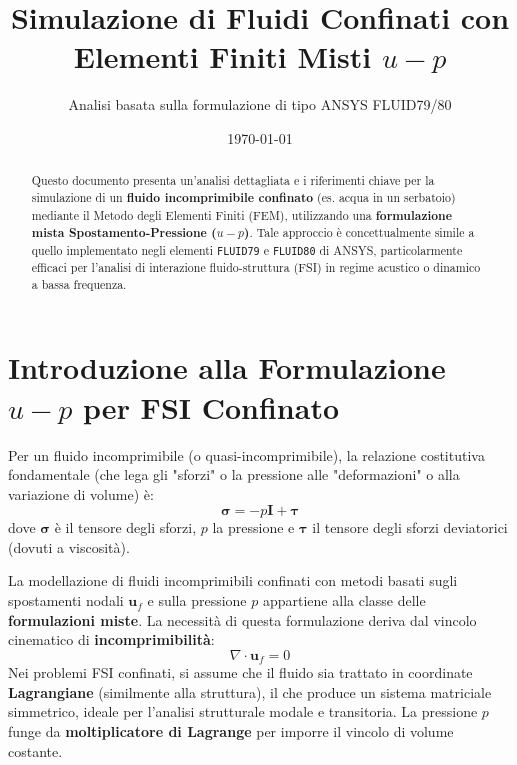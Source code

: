 \documentclass{article}
\title{\bfseries Simulazione di Fluidi Confinati con Elementi Finiti Misti $u-p$}
\author{Analisi basata sulla formulazione di tipo ANSYS FLUID79/80}
\date{\today}
\begin{document}
\maketitle

\begin{abstract}
Questo documento presenta un'analisi dettagliata e i riferimenti chiave per la simulazione di un \textbf{fluido incomprimibile confinato} (es. acqua in un serbatoio) mediante il Metodo degli Elementi Finiti (FEM), utilizzando una \textbf{formulazione mista Spostamento-Pressione ($u-p$)}. Tale approccio è concettualmente simile a quello implementato negli elementi \texttt{FLUID79} e \texttt{FLUID80} di ANSYS, particolarmente efficaci per l'analisi di interazione fluido-struttura (FSI) in regime acustico o dinamico a bassa frequenza.
\end{abstract}

\section{Introduzione alla Formulazione $u-p$ per FSI Confinato}

Per un fluido incomprimibile (o quasi-incomprimibile), la relazione costitutiva fondamentale (che lega gli "sforzi" o la pressione alle "deformazioni" o alla variazione di volume) è:$$\mathbf{\sigma} = -p\mathbf{I} + \mathbf{\tau}$$dove $\mathbf{\sigma}$ è il tensore degli sforzi, $p$ la pressione e $\mathbf{\tau}$ il tensore degli sforzi deviatorici (dovuti a viscosità).

La modellazione di fluidi incomprimibili confinati con metodi basati sugli spostamenti nodali $\mathbf{u}_f$ e sulla pressione $p$ appartiene alla classe delle \textbf{formulazioni miste}. La necessità di questa formulazione deriva dal vincolo cinematico di \textbf{incomprimibilità}:
%
$$ \nabla \cdot \mathbf{u}_f = 0 $$
%
Nei problemi FSI confinati, si assume che il fluido sia trattato in coordinate \textbf{Lagrangiane} (similmente alla struttura), il che produce un sistema matriciale simmetrico, ideale per l'analisi strutturale modale e transitoria. La pressione $p$ funge da \textbf{moltiplicatore di Lagrange} per imporre il vincolo di volume costante.
\end{document}
